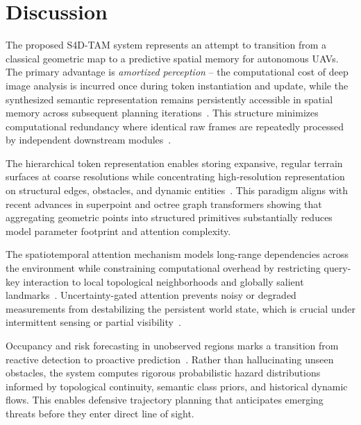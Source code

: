 \section{Discussion}
\label{sec:discussion}

The proposed S4D-TAM system represents an attempt to transition from a classical geometric map to a predictive spatial memory for autonomous UAVs. The primary advantage is \emph{amortized perception} -- the computational cost of deep image analysis is incurred once during token instantiation and update, while the synthesized semantic representation remains persistently accessible in spatial memory across subsequent planning iterations~\cite{pomianek2026s4dtam}. This structure minimizes computational redundancy where identical raw frames are repeatedly processed by independent downstream modules~\cite{rosen2024scene, ding2025survey}.

The hierarchical token representation enables storing expansive, regular terrain surfaces at coarse resolutions while concentrating high-resolution representation on structural edges, obstacles, and dynamic entities~\cite{li2024hislam, tian2024same, xiang2021customizable, zhang2021you, he2024efficient}. This paradigm aligns with recent advances in superpoint and octree graph transformers showing that aggregating geometric points into structured primitives substantially reduces model parameter footprint and attention complexity.

The spatiotemporal attention mechanism models long-range dependencies across the environment while constraining computational overhead by restricting query-key interaction to local topological neighborhoods and globally salient landmarks~\cite{yu2025driveoccworld, silva2024s2tpvformer, liao2025i2world, pcpnet2024}. Uncertainty-gated attention prevents noisy or degraded measurements from destabilizing the persistent world state, which is crucial under intermittent sensing or partial visibility~\cite{pomianek2026s4dtam, cai2024neusis}.

Occupancy and risk forecasting in unobserved regions marks a transition from reactive detection to proactive prediction~\cite{pomianek2026s4dtam, yu2025driveoccworld, mei2025irwm, liao2025i2world, zheng2024gaussianad, liu2025hybrid}. Rather than hallucinating unseen obstacles, the system computes rigorous probabilistic hazard distributions informed by topological continuity, semantic class priors, and historical dynamic flows. This enables defensive trajectory planning that anticipates emerging threats before they enter direct line of sight.

